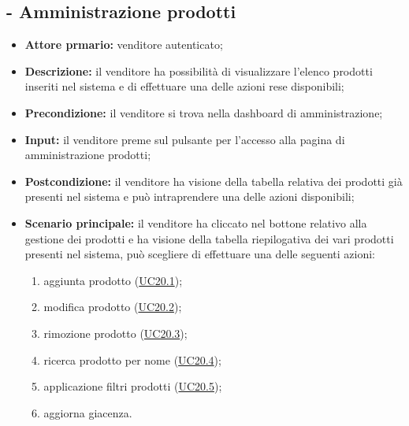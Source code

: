 \subsection{ - Amministrazione prodotti}
\begin{itemize}
    \item \textbf{Attore prmario:} venditore autenticato;
    \item \textbf{Descrizione:} il venditore ha possibilità di visualizzare l’elenco prodotti inseriti nel sistema e di effettuare una delle azioni rese disponibili;
    \item \textbf{Precondizione:} il venditore si trova nella dashboard di amministrazione;
    \item \textbf{Input:} il venditore preme sul pulsante per l'accesso alla pagina di amministrazione prodotti;
    \item \textbf{Postcondizione:} il venditore ha visione della tabella relativa dei prodotti già presenti nel sistema e può intraprendere una delle azioni disponibili;
    \item \textbf{Scenario principale:} il venditore ha cliccato nel bottone relativo alla gestione dei prodotti e ha visione della tabella riepilogativa dei vari prodotti presenti nel sistema, può scegliere di effettuare una delle seguenti azioni:
          \begin{enumerate}
              \item aggiunta prodotto (\hyperref[UC20.1]{UC20.1});
              \item modifica prodotto (\hyperref[UC20.2]{UC20.2});
              \item rimozione prodotto (\hyperref[UC20.3]{UC20.3});
              \item ricerca prodotto per nome (\hyperref[UC20.4]{UC20.4});
              \item applicazione filtri prodotti (\hyperref[UC20.5]{UC20.5});
              \item aggiorna giacenza.
          \end{enumerate}
\end{itemize}

\stepsubUserCase

